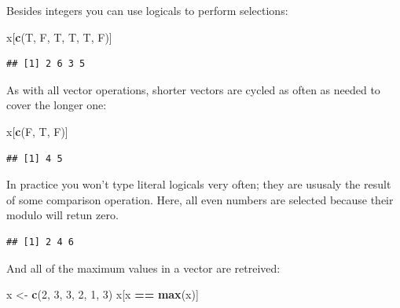 \documentclass[]{book}
\newenvironment{Shaded}{\begin{snugshade}}{\end{snugshade}}
\newcommand{\DecValTok}[1]{\textcolor[rgb]{0.00,0.00,0.81}{#1}}
\newcommand{\KeywordTok}[1]{\textcolor[rgb]{0.13,0.29,0.53}{\textbf{#1}}}
\newcommand{\NormalTok}[1]{#1}
\newcommand{\OperatorTok}[1]{\textcolor[rgb]{0.81,0.36,0.00}{\textbf{#1}}}
\newcommand{\StringTok}[1]{\textcolor[rgb]{0.31,0.60,0.02}{#1}}
\begin{document}
Besides integers you can use logicals to perform selections:

\begin{Shaded}
\begin{Highlighting}[]
\NormalTok{x[}\KeywordTok{c}\NormalTok{(T, F, T, T, T, F)]}
\end{Highlighting}
\end{Shaded}

\begin{verbatim}
## [1] 2 6 3 5
\end{verbatim}

As with all vector operations, shorter vectors are cycled as often as needed to cover the longer one:

\begin{Shaded}
\begin{Highlighting}[]
\NormalTok{x[}\KeywordTok{c}\NormalTok{(F, T, F)]}
\end{Highlighting}
\end{Shaded}

\begin{verbatim}
## [1] 4 5
\end{verbatim}

In practice you won't type literal logicals very often; they are ususaly the result of some comparison operation. Here, all even numbers are selected because their modulo will retun zero.

\begin{Shaded}
\end{Shaded}

\begin{verbatim}
## [1] 2 4 6
\end{verbatim}

And all of the maximum values in a vector are retreived:

\begin{Shaded}
\begin{Highlighting}[]
\NormalTok{x <-}\StringTok{ }\KeywordTok{c}\NormalTok{(}\DecValTok{2}\NormalTok{, }\DecValTok{3}\NormalTok{, }\DecValTok{3}\NormalTok{, }\DecValTok{2}\NormalTok{, }\DecValTok{1}\NormalTok{, }\DecValTok{3}\NormalTok{)}
\NormalTok{x[x }\OperatorTok{==}\StringTok{ }\KeywordTok{max}\NormalTok{(x)]}
\end{Highlighting}
\end{Shaded}
\end{document}
